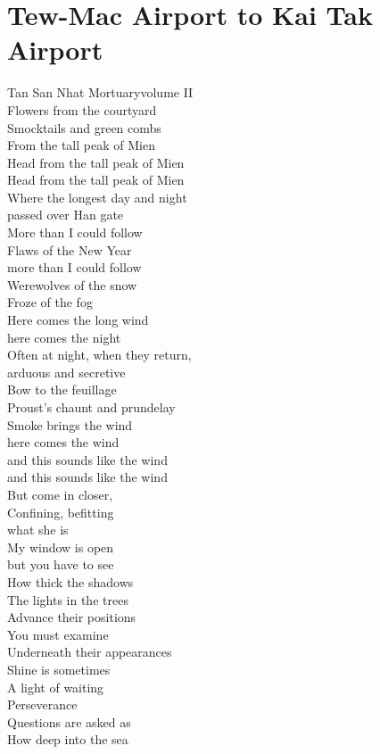 \documentclass[smalldemyvopaper,11pt,twoside,onecolumn,openright,extrafontsizes]{memoir}
\begin{document}
\chapter{Tew-Mac Airport to Kai Tak Airport}
Tan San Nhat Mortuaryvolume II
\\Flowers from the courtyard
\\Smocktails and green combs
\\From the tall peak of Mien
\\Head from the tall peak of Mien
\\Head from the tall peak of Mien
\\Where the longest day and night
\\passed over Han gate
\\More than I could follow
\\Flaws of the New Year
\\more than I could follow
\\Werewolves of the snow
\\Froze of the fog
\\Here comes the long wind
\\here comes the night
\\Often at night, when they return,
\\arduous and secretive
\\Bow to the feuillage
\\Proust's chaunt and prundelay
\\Smoke brings the wind
\\here comes the wind
\\and this sounds like the wind
\\and this sounds like the wind
\\But come in closer,
\\Confining, befitting
\\what she is
\\My window is open
\\but you have to see
\\How thick the shadows
\\The lights in the trees
\\Advance their positions
\\You must examine
\\Underneath their appearances
\\Shine is sometimes
\\A light of waiting
\\Perseverance
\\Questions are asked as
\\How deep into the sea
\end{document}
